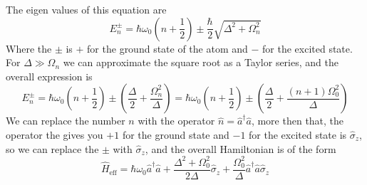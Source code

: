 \documentclass[english, a4paper, 12pt, twoside]{article}
\numberwithin{equation}{section} %
\begin{document}
The eigen values of this equation are
\[
    E_n^\pm = \hbar \omega_0 (n + \frac{1}{2}) \pm \frac{\hbar}{2}\sqrt{\Delta^2 +\Omega_n^2}
\]
Where the $\pm$ is $+$ for the ground state of the atom and $-$ for the excited state. For $\Delta \gg \Omega_n$ we can approximate the square root as a Taylor series, and the overall expression is
\[
    E_n^\pm = \hbar \omega_0 (n + \frac{1}{2}) \pm (\frac{\Delta}{2} + \frac{\Omega_n^2}{\Delta}) =  \hbar \omega_0 (n + \frac{1}{2}) \pm (\frac{\Delta}{2} + \frac{(n+1)\Omega_0^2}{\Delta})
\]
We can replace the number $n$ with the operator $\hat{n} = \hat{a}^\dag \hat{a}$, more then that, the operator the gives you $+1$ for the ground state and $-1$ for the excited state is $\hat{\sigma}_z$, so we can replace the $\pm$ with $\hat{\sigma}_z$, and the overall Hamiltonian is of the form
\begin{equation} \label{eq:dispersive-hamiltonian}
    \hat{H}_{\text{eff}} = \hbar \omega_0 \hat{a}^\dag \hat{a} + \frac{\Delta^2 + \Omega_0^2}{2\Delta}\hat{\sigma}_z + \frac{\Omega_0^2}{\Delta} \hat{a}^\dag \hat{a} \hat{\sigma}_z
\end{equation}



\end{document}
